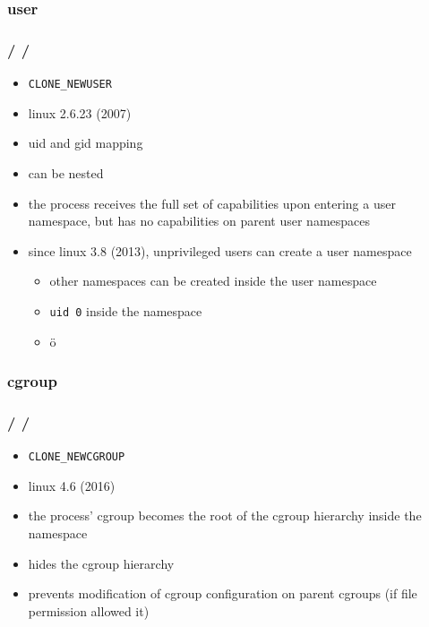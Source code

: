\documentclass{beamer}
\newcommand{\autotitle}
{\frametitle{
    \secname
    \ifx\insertsubsection\empty
    \else
        /\subsecname
        \ifx\insertsubsubsection\empty\else/\subsubsecname\fi
    \fi}}
\begin{document}
\subsubsection{user}

\begin{frame}
    \autotitle
    \begin{itemize}
        \item \texttt{CLONE\_NEWUSER}
        \item linux 2.6.23 (2007)
        \item uid and gid mapping
        \item can be nested
        \item
            the process receives the full set of capabilities upon entering a
            user namespace, but has no capabilities on parent user namespaces
        \item
            since linux 3.8 (2013), unprivileged users can create a user
            namespace
        \begin{itemize}
            \item other namespaces can be created inside the user namespace
            \item \texttt{uid 0} inside the namespace
            \item<2> ö
        \end{itemize}
    \end{itemize}
\end{frame}

\subsubsection{cgroup}

\begin{frame}
    \autotitle
    \begin{itemize}
        \item \texttt{CLONE\_NEWCGROUP}
        \item linux 4.6 (2016)
        \item
            the process' cgroup becomes the root of the cgroup hierarchy
            inside the namespace
        \item hides the cgroup hierarchy
        \item
            prevents modification of cgroup configuration on parent cgroups (if
            file permission allowed it)
    \end{itemize}
\end{frame}
\end{document}
